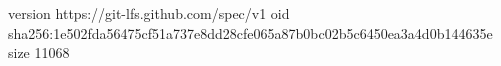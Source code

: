 version https://git-lfs.github.com/spec/v1
oid sha256:1e502fda56475cf51a737e8dd28cfe065a87b0bc02b5c6450ea3a4d0b144635e
size 11068
